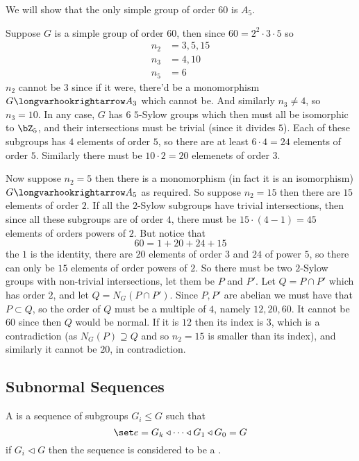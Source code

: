 \documentclass[10pt]{article}
\begin{document}
\begin{exam*}

    We will show that the only simple group of order $60$ is $A_5$.

    Suppose $G$ is a simple group of order $60$, then since $60=2^2\cdot3\cdot5$ so
    \begin{align*}
    n_2 &= 3, 5, 15 \\
    n_3 &= 4, 10 \\
    n_5 &= 6
    \end{align*}
    $n_2$ cannot be $3$ since if it were, there'd be a monomorphism $G\longvarhookrightarrow A_3$ which cannot be.
    And similarly $n_3\neq4$, so $n_3=10$.
    In any case, $G$ has $6$ $5$-Sylow groups which then must all be isomorphic to $\bZ_5$, and their intersections must be trivial (since it divides $5$).
    Each of these subgroups has $4$ elements of order $5$, so there are at least $6\cdot4=24$ elements of order $5$.
    Similarly there must be $10\cdot2=20$ elemenets of order $3$.

    Now suppose $n_2=5$ then there is a monomorphism (in fact it is an isomorphism) $G\longvarhookrightarrow A_5$ as required.
    So suppose $n_2=15$ then there are $15$ elements of order $2$.
    If all the $2$-Sylow subgroups have trivial intersections, then since all these subgroups are of order $4$, there must be $15\cdot(4-1)=45$ elements of orders powers of $2$.
    But notice that
    \[ 60 = 1 + 20 + 24 + 15 \]
    the $1$ is the identity, there are $20$ elements of order $3$ and $24$ of power $5$, so there can only be $15$ elements of order powers of $2$.
    So there must be two $2$-Sylow groups with non-trivial intersections, let them be $P$ and $P'$.
    Let $Q=P\cap P'$ which has order $2$, and let $Q=N_G(P\cap P')$.
    Since $P,P'$ are abelian we must have that $P\subset Q$, so the order of $Q$ must be a multiple of $4$, namely $12,20,60$.
    It cannot be $60$ since then $Q$ would be normal.
    If it is $12$ then its index is $3$, which is a contradiction (as $N_G(P)\supseteq Q$ and so $n_2=15$ is smaller than its index), and similarly it cannot be $20$, in contradiction.

\end{exam*}

\newpage
\subsection{Subnormal Sequences}

\begin{defn*}

    A  is a sequence of subgroups $G_i\leq G$ such that
    \[ \set e = G_k\triangleleft \dots \triangleleft G_1 \triangleleft G_0 = G \]
    if $G_i\triangleleft G$ then the sequence is considered to be a .

\end{defn*}
\end{document}
